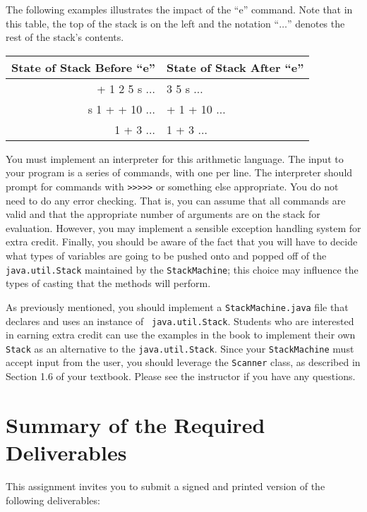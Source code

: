 The following examples illustrates the impact of the ``e'' command. Note that in this table, the top of the stack is on
the left and the notation ``$\ldots$'' denotes the rest of the stack's contents.

\begin{tabular}{r | l}
  State of Stack Before ``e'' & State of Stack After ``e'' \\ \hline
  + 1 2 5 s $\ldots$  & 3 5 s $\ldots$ \\
  s 1 + + 10 $\ldots$ & + 1 + 10 $\ldots$ \\
  1 + 3 $\ldots$      & 1 + 3 $\ldots$ \\
\end{tabular}

You must implement an interpreter for this arithmetic language. The input to your program is a series of commands, with
one per line. The interpreter should prompt for commands with
\texttt{\textgreater{}\textgreater{}\textgreater{}\textgreater{}\textgreater{}} or something else appropriate. You do
not need to do any error checking.  That is, you can assume that all commands are valid and that the appropriate number
of arguments are on the stack for evaluation. However, you may implement a sensible exception handling system for
extra credit.  Finally, you should be aware of the fact that you will have to decide what types of variables are going
to be pushed onto and popped off of the {\tt java.util.Stack} maintained by the \texttt{StackMachine}; this choice may
influence the types of casting that the methods will perform.

As previously mentioned, you should implement a {\tt StackMachine.java} file that declares and uses an instance of {\tt
java.util.Stack}. Students who are interested in earning extra credit can use the examples in the book to implement
their own {\tt Stack} as an alternative to the {\tt java.util.Stack}.  Since your {\tt StackMachine} must accept input
from the user, you should leverage the {\tt Scanner} class, as described in Section 1.6 of your textbook. Please see the
instructor if you have any questions.

\section*{Summary of the Required Deliverables}

This assignment invites you to submit a signed and printed version of the following deliverables:

